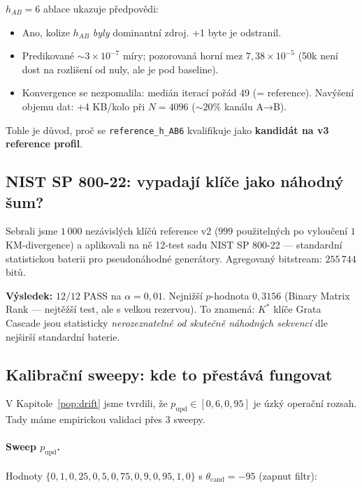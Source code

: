 \documentclass[11pt,a4paper]{article}
\begin{document}
\begin{aha}
$h_{AB}=6$ ablace ukazuje předpovědi:
\begin{itemize}[leftmargin=*]
\item Ano, kolize $h_{AB}$ \emph{byly} dominantní zdroj. +1 byte je odstranil.
\item Predikované $\sim 3 \times 10^{-7}$ míry; pozorovaná horní mez $7{,}38 \times 10^{-5}$ (50k není dost na rozlišení od nuly, ale je pod baseline).
\item Konvergence se nezpomalila: medián iterací pořád 49 (= reference). Navýšení objemu dat: +4 KB/kolo při $N=4096$ ($\sim 20\%$ kanálu A→B).
\end{itemize}

Tohle je důvod, proč se \texttt{reference\_h\_AB6} kvalifikuje jako \textbf{kandidát na v3 reference profil}.
\end{aha}

\subsection{NIST SP 800-22: vypadají klíče jako náhodný šum?}\label{pop:exp-nist}

Sebrali jsme $1\,000$ nezávislých klíčů reference v2 ($999$ použitelných po vyloučení $1$ KM-divergence) a aplikovali na ně 12-test sadu NIST SP 800-22 --- standardní statistickou baterii pro pseudonáhodné generátory. Agregovaný bitstream: $255\,744$ bitů.

\textbf{Výsledek:} $12/12$ PASS na $\alpha = 0{,}01$. Nejnižší $p$-hodnota $0{,}3156$ (Binary Matrix Rank --- nejtěžší test, ale s velkou rezervou). To znamená: $K^*$ klíče Grata Cascade jsou statisticky \emph{nerozeznatelné od skutečně náhodných sekvencí} dle nejširší standardní baterie.

\subsection{Kalibrační sweepy: kde to přestává fungovat}\label{pop:exp-sweeps}

V Kapitole~\ref{pop:drift} jsme tvrdili, že $p_\text{upd} \in [0{,}6, 0{,}95]$ je úzký operační rozsah. Tady máme empirickou validaci přes 3 sweepy.

\paragraph{Sweep $p_\text{upd}$.}
Hodnoty $\{0{,}1, 0{,}25, 0{,}5, 0{,}75, 0{,}9, 0{,}95, 1{,}0\}$ s $\theta_\text{cand} = -95$ (zapnut filtr):
\end{document}
